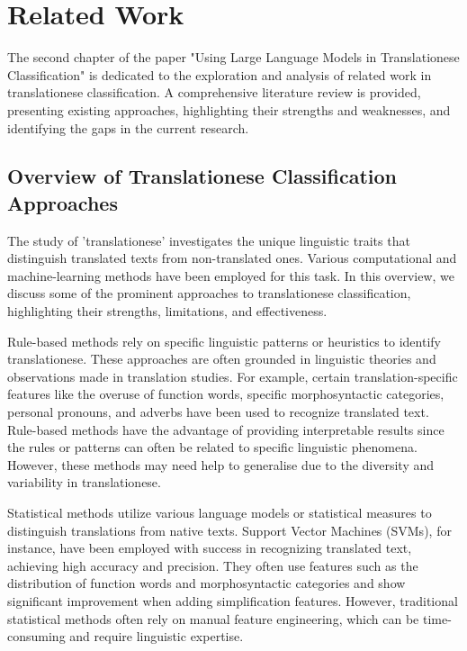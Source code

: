 \chapter{Related Work}

The second chapter of the paper "Using Large Language Models in Translationese Classification" is dedicated to the exploration and analysis of related work in translationese classification. A comprehensive literature review is provided, presenting existing approaches, highlighting their strengths and weaknesses, and identifying the gaps in the current research.

\section{Overview of Translationese Classification Approaches}

The study of 'translationese' investigates the unique linguistic traits that distinguish translated texts from non-translated ones. Various computational and machine-learning methods have been employed for this task. In this overview, we discuss some of the prominent approaches to translationese classification, highlighting their strengths, limitations, and effectiveness.


Rule-based methods rely on specific linguistic patterns or heuristics to identify translationese. These approaches are often grounded in linguistic theories and observations made in translation studies. For example, certain translation-specific features like the overuse of function words, specific morphosyntactic categories, personal pronouns, and adverbs have been used to recognize translated text. Rule-based methods have the advantage of providing interpretable results since the rules or patterns can often be related to specific linguistic phenomena. However, these methods may need help to generalise due to the diversity and variability in translationese.

Statistical methods utilize various language models or statistical measures to distinguish translations from native texts. Support Vector Machines (SVMs), for instance, have been employed with success in recognizing translated text, achieving high accuracy and precision. They often use features such as the distribution of function words and morphosyntactic categories and show significant improvement when adding simplification features. However, traditional statistical methods often rely on manual feature engineering, which can be time-consuming and require linguistic expertise.

